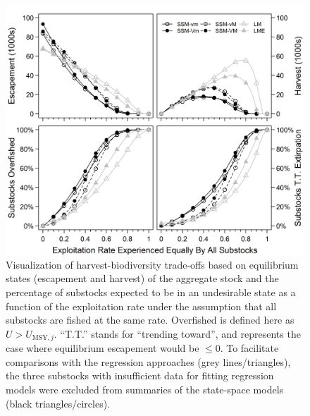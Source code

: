 \documentclass[12pt,]{book}
\theoremstyle{definition}
\theoremstyle{definition}
\theoremstyle{definition}
\theoremstyle{remark}
\begin{document}
\begin{figure}
  \centering
  \includegraphics{img/Ch4/kusko-eq-states.jpg}
  \caption{Visualization of harvest-biodiversity trade-offs based on equilibrium states (escapement and harvest) of the aggregate stock and the percentage of substocks expected to be in an undesirable state as a function of the exploitation rate under the assumption that all substocks are fished at the same rate. Overfished is defined here as $U > U_{\text{MSY},j}$. ``T.T.'' stands for ``trending toward'', and represents the case where equilibrium escapement would be $\le 0$. To facilitate comparisons with the regression approaches (grey lines/triangles), the three substocks with insufficient data for fitting regression models were excluded from summaries of the state-space models (black triangles/circles).} 
  \label{fig:kusko-eq-states}
\end{figure}

\clearpage
\end{document}
